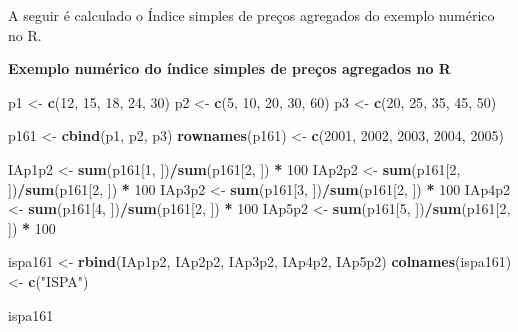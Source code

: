 \documentclass[
]{book}
\newenvironment{Shaded}{\begin{snugshade}}{\end{snugshade}}
\newcommand{\DecValTok}[1]{\textcolor[rgb]{0.00,0.00,0.81}{#1}}
\newcommand{\KeywordTok}[1]{\textcolor[rgb]{0.13,0.29,0.53}{\textbf{#1}}}
\newcommand{\NormalTok}[1]{#1}
\newcommand{\OperatorTok}[1]{\textcolor[rgb]{0.81,0.36,0.00}{\textbf{#1}}}
\newcommand{\StringTok}[1]{\textcolor[rgb]{0.31,0.60,0.02}{#1}}
\begin{document}
A seguir é calculado o Índice simples de preços agregados do exemplo numérico no R.

\textbf{Exemplo numérico do índice simples de preços agregados no R}

\begin{Shaded}
\begin{Highlighting}[]
\NormalTok{p1 <-}\StringTok{ }\KeywordTok{c}\NormalTok{(}\DecValTok{12}\NormalTok{, }\DecValTok{15}\NormalTok{, }\DecValTok{18}\NormalTok{, }\DecValTok{24}\NormalTok{, }\DecValTok{30}\NormalTok{)}
\NormalTok{p2 <-}\StringTok{ }\KeywordTok{c}\NormalTok{(}\DecValTok{5}\NormalTok{, }\DecValTok{10}\NormalTok{, }\DecValTok{20}\NormalTok{, }\DecValTok{30}\NormalTok{, }\DecValTok{60}\NormalTok{)}
\NormalTok{p3 <-}\StringTok{ }\KeywordTok{c}\NormalTok{(}\DecValTok{20}\NormalTok{, }\DecValTok{25}\NormalTok{, }\DecValTok{35}\NormalTok{, }\DecValTok{45}\NormalTok{, }\DecValTok{50}\NormalTok{)}

\NormalTok{p161 <-}\StringTok{ }\KeywordTok{cbind}\NormalTok{(p1, p2, p3)}
\KeywordTok{rownames}\NormalTok{(p161) <-}\StringTok{ }\KeywordTok{c}\NormalTok{(}\DecValTok{2001}\NormalTok{, }\DecValTok{2002}\NormalTok{, }\DecValTok{2003}\NormalTok{, }\DecValTok{2004}\NormalTok{, }\DecValTok{2005}\NormalTok{)}

\NormalTok{IAp1p2 <-}\StringTok{ }\KeywordTok{sum}\NormalTok{(p161[}\DecValTok{1}\NormalTok{, ])}\OperatorTok{/}\KeywordTok{sum}\NormalTok{(p161[}\DecValTok{2}\NormalTok{, ]) }\OperatorTok{*}\StringTok{ }\DecValTok{100}
\NormalTok{IAp2p2 <-}\StringTok{ }\KeywordTok{sum}\NormalTok{(p161[}\DecValTok{2}\NormalTok{, ])}\OperatorTok{/}\KeywordTok{sum}\NormalTok{(p161[}\DecValTok{2}\NormalTok{, ]) }\OperatorTok{*}\StringTok{ }\DecValTok{100}
\NormalTok{IAp3p2 <-}\StringTok{ }\KeywordTok{sum}\NormalTok{(p161[}\DecValTok{3}\NormalTok{, ])}\OperatorTok{/}\KeywordTok{sum}\NormalTok{(p161[}\DecValTok{2}\NormalTok{, ]) }\OperatorTok{*}\StringTok{ }\DecValTok{100}
\NormalTok{IAp4p2 <-}\StringTok{ }\KeywordTok{sum}\NormalTok{(p161[}\DecValTok{4}\NormalTok{, ])}\OperatorTok{/}\KeywordTok{sum}\NormalTok{(p161[}\DecValTok{2}\NormalTok{, ]) }\OperatorTok{*}\StringTok{ }\DecValTok{100}
\NormalTok{IAp5p2 <-}\StringTok{ }\KeywordTok{sum}\NormalTok{(p161[}\DecValTok{5}\NormalTok{, ])}\OperatorTok{/}\KeywordTok{sum}\NormalTok{(p161[}\DecValTok{2}\NormalTok{, ]) }\OperatorTok{*}\StringTok{ }\DecValTok{100}

\NormalTok{ispa161 <-}\StringTok{ }\KeywordTok{rbind}\NormalTok{(IAp1p2, IAp2p2, IAp3p2, IAp4p2, IAp5p2)}
\KeywordTok{colnames}\NormalTok{(ispa161) <-}\StringTok{ }\KeywordTok{c}\NormalTok{(}\StringTok{"ISPA"}\NormalTok{)}

\NormalTok{ispa161}
\end{Highlighting}
\end{Shaded}
\end{document}

